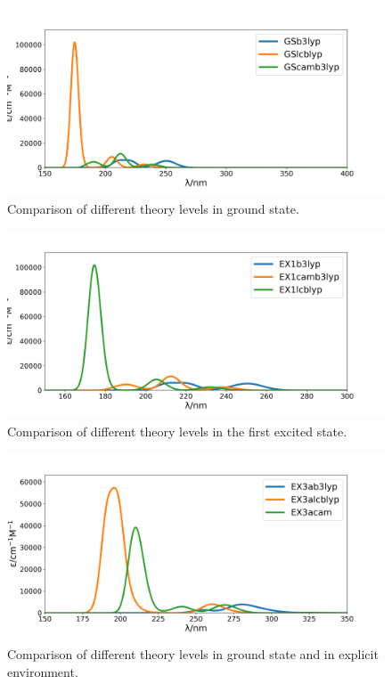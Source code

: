 \documentclass[]{interact}
\theoremstyle{plain}%
\theoremstyle{definition}
\theoremstyle{remark}
\begin{document}
\begin{figure}
	\includegraphics[width=\textwidth]{GS.png} 
	\caption{Comparison of different theory levels in ground state.}
	\label{GSlevel}
\end{figure}

\begin{figure}
	\includegraphics[width=\textwidth]{EX.png} 
	\caption{Comparison of different theory levels in the first excited state.}
	\label{EXlevel}
\end{figure}

\begin{figure}
	\includegraphics[width=\textwidth]{EXh2o.png} 
	\caption{Comparison of different theory levels in ground state and in explicit environment.}
	\label{EXh2olevel}
\end{figure}
\end{document}

